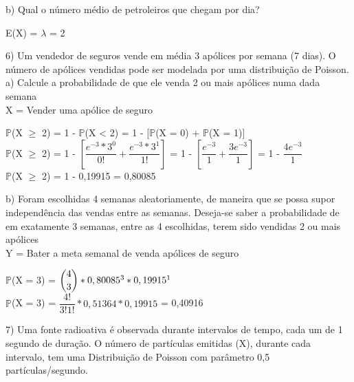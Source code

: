 \documentclass[12pt,a4paper]{article}
\begin{document}
	b) Qual o número médio de petroleiros que chegam por dia?
	\vspace{0.5cm}\\
	\begin{center}
		E(X) = $\lambda$ = 2
	\end{center}
	\vspace{1cm}
	6) Um vendedor de seguros vende em média 3 apólices por semana (7 dias). O número de	apólices vendidas pode ser modelada por uma distribuição de Poisson.\\
	a) Calcule a probabilidade de que ele venda 2 ou mais apólices numa dada semana
	\vspace{0.5cm}\\
	X = Vender uma apólice de seguro
	\begin{center}
		\vspace{0.5cm}
		$\mathbb{P}$(X $\geq$ 2) = 1 - $\mathbb{P}$(X < 2) = 1 - [$\mathbb{P}$(X = 0) + $\mathbb{P}$(X = 1)]
		\vspace{0.5cm}\\
		$\mathbb{P}$(X $\geq$ 2) = 1 - $\left[\dfrac{e^{-3} * 3^0}{0!} + \dfrac{e^{-3} * 3^1}{1!}\right]$ = 1 - $\left[\dfrac{e^{-3}}{1} + \dfrac{3e^{-3}}{1}\right]$ = 1 - $\dfrac{4e^{-3}}{1}$
		\vspace{0.5cm}\\
		$\mathbb{P}$(X $\geq$ 2) = 1 - 0,19915 = 0,80085
	\end{center}
	\vspace{1cm}
	b) Foram escolhidas 4 semanas aleatoriamente, de maneira que se possa
	supor independência das vendas entre as semanas. Deseja-se saber a
	probabilidade de em exatamente 3 semanas, entre as 4 escolhidas, terem
	sido vendidas 2 ou mais apólices
	\vspace{0.5cm}\\
	Y = Bater a meta semanal de venda apólices de seguro
	\begin{center}
		\vspace{0.5cm}
		$\mathbb{P}$(X = 3) = $\dbinom{4}{3} * 0,80085^{3} * 0,19915^{1}$ 
		\vspace{0.5cm}\\
		$\mathbb{P}$(X = 3) = $\dfrac{4!}{3!1!} * 0,51364 * 0,19915$ = 0,40916
	\end{center}
	\vspace{1cm}
	7) Uma fonte radioativa é observada durante intervalos de tempo, cada um de 1 segundo de duração. O número de partículas emitidas (X), durante cada intervalo, tem uma Distribuição de Poisson com parâmetro
	0,5 partículas/segundo.\\
\end{document}
